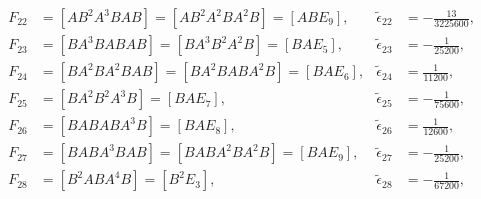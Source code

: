 \documentclass[12pt]{article}
\begin{document}
\begin{equation}
\begin{aligned}
    F_{22} &= \left [ A B^{2} A^{3} B A B \right ] = \left [ A B^{2} A^{2} B A^{2} B \right ] = \left [ A B E_{9} \right ], & \tilde{\epsilon}_{22} &= - \frac{13}{3 225 600}, \\
    F_{23} &= \left [ B A^{3} B A B A B \right ] = \left [ B A^{3} B^{2} A^{2} B \right ] = \left [ B A E_{5} \right ], & \tilde{\epsilon}_{23} &= - \frac{1}{25 200}, \\
    F_{24} &= \left [ B A^{2} B A^{2} B A B \right ] = \left [ B A^{2} B A B A^{2} B \right ] = \left [ B A E_{6} \right ], & \tilde{\epsilon}_{24} &= \frac{1}{11 200}, \\
    F_{25} &= \left [ B A^{2} B^{2} A^{3} B \right ] = \left [ B A E_{7} \right ], & \tilde{\epsilon}_{25} &= - \frac{1}{75 600}, \\
    F_{26} &= \left [ B A B A B A^{3} B \right ] = \left [ B A E_{8} \right ], & \tilde{\epsilon}_{26} &= \frac{1}{12 600}, \\
    F_{27} &= \left [ B A B A^{3} B A B \right ] = \left [ B A B A^{2} B A^{2} B \right ] = \left [ B A E_{9} \right ], & \tilde{\epsilon}_{27} &= - \frac{1}{25 200}, \\
    F_{28} &= \left [ B^{2} A B A^{4} B \right ] = \left [ B^{2} E_{3} \right ], & \tilde{\epsilon}_{28} &= - \frac{1}{67 200}, \\
  \end{aligned}
\end{equation}

\vspace{0.5cm}
\end{document}
